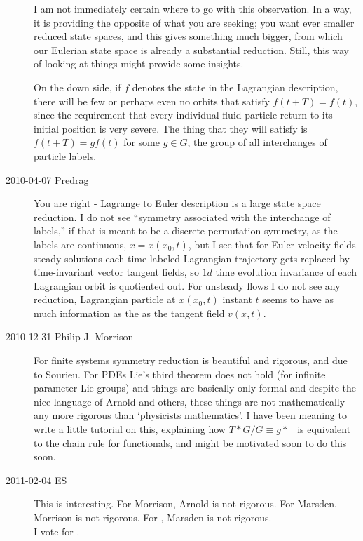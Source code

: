 \begin{description}
I am not immediately certain where to go with this
observation.  In a way, it is providing the opposite of what
you are seeking; you want ever smaller reduced state spaces,
and this gives something much bigger, from which our Eulerian
state space is already a substantial reduction.  Still, this
way of looking at things might provide some insights.

On the down side, if $f$ denotes the state in the Lagrangian
description, there will be few or perhaps even no orbits that
satisfy $f(t+T) = f(t)$, since the requirement that every
individual fluid particle return to its initial position is
very severe.  The thing that they will satisfy is $f(t+T) = g
f(t)$ for some $g \in G$, the group of all interchanges of
particle labels.

\item[2010-04-07 Predrag]
You are right - Lagrange to Euler description
is a large state space reduction. I do not see
``symmetry associated with the interchange of labels,''
if that is meant to be a discrete permutation symmetry, as
the labels are continuous, $x=x(x_0,t)$, but I see that
for Euler velocity fields steady solutions each time-labeled
Lagrangian trajectory gets replaced by time-invariant
vector tangent fields, so $1d$ time evolution invariance of each
Lagrangian
orbit is quotiented out. For unsteady flows I do not see any reduction,
Lagrangian particle at $x(x_0,t)$ instant $t$ seems to have as
much information as the as the tangent field $v(x,t)$.


\item[2010-12-31 Philip J. Morrison]
For finite systems symmetry reduction is beautiful and rigorous, and due
to Sourieu. For PDEs Lie's third theorem does not hold (for infinite
parameter Lie groups) and things are basically only formal and despite
the nice language of Arnold and others, these things are not
mathematically any more rigorous than `physicists mathematics'.  I have
been meaning to write a little tutorial on this, explaining how
$T*G/G\equiv g*$ \etc\ is equivalent to the chain rule for functionals,
and might be motivated soon to do this soon.

\item[2011-02-04 ES] This is interesting. For Morrison, Arnold is not rigorous.
For Marsden, Morrison is not rigorous.
For ,
Marsden is not rigorous.\\

I vote for .


\end{description}
